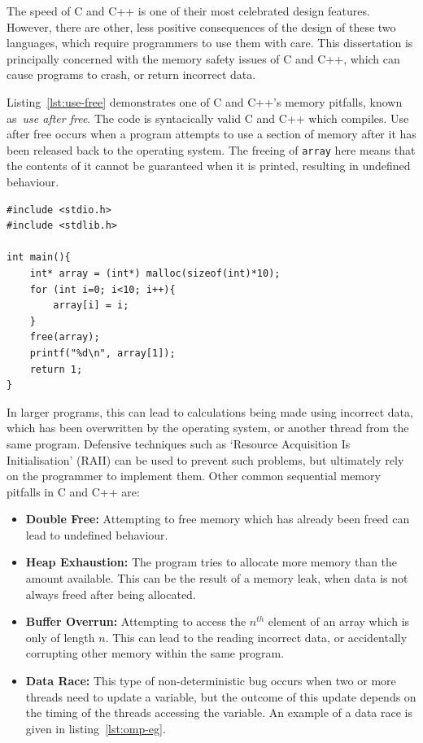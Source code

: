 The speed of C and C++ is one of their most celebrated design features. However, there are other, less positive consequences of the design of these two languages, which require programmers to use them with care. This dissertation is principally concerned with the memory safety issues of C and C++, which can cause programs to crash, or return incorrect data.

Listing~\ref{lst:use-free} demonstrates one of C and C++'s memory pitfalls, known as~{\em use after free}. The code is syntacically valid C and C++ which compiles. Use after free occurs when a program attempts to use a section of memory after it has been released back to the operating system.
The freeing of \texttt{array} here means that the contents of it cannot be guaranteed when it is printed, resulting in undefined behaviour.

\begin{code}
\begin{verbatim}
#include <stdio.h>
#include <stdlib.h>

int main(){
    int* array = (int*) malloc(sizeof(int)*10);
    for (int i=0; i<10; i++){
        array[i] = i;
    }
    free(array);
    printf("%d\n", array[1]);
    return 1;
}
\end{verbatim}
\label{lst:use-free}
\end{code}

In larger programs, this can lead to calculations being made using incorrect data, which has been overwritten by the operating system, or another thread from the same program. Defensive techniques such as `Resource Acquisition Is Initialisation' (RAII) can be used to prevent such problems, but ultimately rely on the programmer to implement them.
Other common sequential memory pitfalls in C and C++ are:

\begin{itemize}
    \item \textbf{Double Free:} Attempting to free memory which has already been freed can lead to undefined behaviour.
    \item \textbf{Heap Exhaustion:} The program tries to allocate more memory than the amount available. This can be the result of a memory leak, when data is not always freed after being allocated.
    \item \textbf{Buffer Overrun:} Attempting to access the $n^{th}$ element of an array which is only of length $n$. This can lead to the reading incorrect data, or accidentally corrupting other memory within the same program.
    \item \textbf{Data Race:} This type of non-deterministic bug occurs when two or more threads need to update a variable, but the outcome of this update depends on the timing of the threads accessing the variable. An example of a data race is given in listing~\ref{lst:omp-eg}.
\end{itemize}

